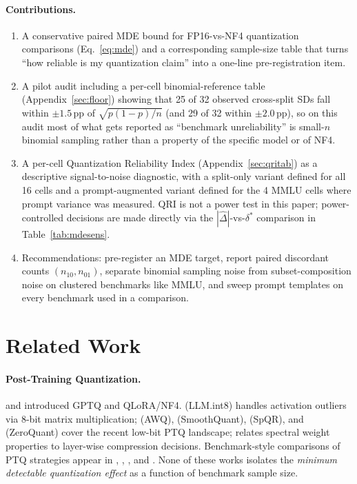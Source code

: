 \documentclass{article}
\begin{document}
\paragraph{Contributions.}
\begin{enumerate}
    \item A conservative paired MDE bound for FP16-vs-NF4 quantization comparisons (Eq.~\ref{eq:mde}) and a corresponding sample-size table that turns ``how reliable is my quantization claim'' into a one-line pre-registration item.
    \item A pilot audit including a per-cell binomial-reference table (Appendix~\ref{sec:floor}) showing that 25 of 32 observed cross-split SDs fall within $\pm 1.5$\,pp of $\sqrt{p(1-p)/n}$ (and 29 of 32 within $\pm 2.0$\,pp), so on this audit most of what gets reported as ``benchmark unreliability'' is small-$n$ binomial sampling rather than a property of the specific model or of NF4.
    \item A per-cell Quantization Reliability Index (Appendix~\ref{sec:qritab}) as a descriptive signal-to-noise diagnostic, with a split-only variant defined for all 16 cells and a prompt-augmented variant defined for the 4 MMLU cells where prompt variance was measured. QRI is not a power test in this paper; power-controlled decisions are made directly via the $|\hat\Delta|$-vs-$\delta^*$ comparison in Table~\ref{tab:mdesens}.
    \item Recommendations: pre-register an MDE target, report paired discordant counts $(n_{10}, n_{01})$, separate binomial sampling noise from subset-composition noise on clustered benchmarks like MMLU, and sweep prompt templates on every benchmark used in a comparison.
\end{enumerate}

\section{Related Work}

\paragraph{Post-Training Quantization.}
\citet{frantar2023gptq} and \citet{dettmers2024qlora} introduced GPTQ and QLoRA/NF4. \citet{dettmers2022llmint8} (LLM.int8) handles activation outliers via 8-bit matrix multiplication; \citet{lin2023awq} (AWQ), \citet{xiao2023smoothquant} (SmoothQuant), \citet{dettmers2023spqr} (SpQR), and \citet{yao2022zeroquant} (ZeroQuant) cover the recent low-bit PTQ landscape; \citet{lu2024alphapruning} relates spectral weight properties to layer-wise compression decisions. Benchmark-style comparisons of PTQ strategies appear in \citet{li2024evaluating}, \citet{gong2024llmc}, \citet{jin2024comprehensive}, and \citet{zhao2025ptqbench}. None of these works isolates the \emph{minimum detectable quantization effect} as a function of benchmark sample size.
\end{document}
